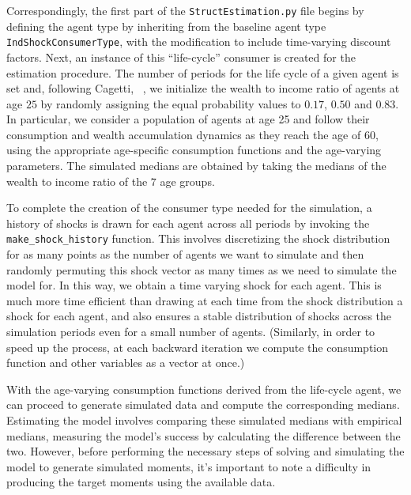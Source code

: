 \documentclass[titlepage, headings=optiontotocandhead]{econtex}
\begin{document}
Correspondingly, the first part of the \texttt{StructEstimation.py} file begins by defining the agent type by inheriting from the baseline agent type \texttt{IndShockConsumerType}, with the modification to include time-varying discount factors. Next, an instance of this ``life-cycle'' consumer is created for the estimation procedure.  The number of periods for the life cycle of a given agent is set and, following Cagetti, ~\citeyearpar{cagettiWprofiles}, we initialize the wealth to income ratio of agents at age $25$ by randomly assigning the equal probability values to $0.17$, $0.50$ and $0.83$. In particular, we consider a population of agents at age 25 and follow their consumption and wealth accumulation dynamics as they reach the age of $60$, using the appropriate age-specific consumption functions and the age-varying parameters. The simulated medians are obtained by taking the medians of the wealth to income ratio of the $7$ age groups.

To complete the creation of the consumer type needed for the simulation, a history of shocks is drawn for each agent across all periods by invoking the \texttt{make\_shock\_history} function. This involves discretizing the shock distribution for as many points as the number of agents we want to simulate and then randomly permuting this shock vector as many times as we need to simulate the model for. In this way, we obtain a time varying shock for each agent. This is much more time efficient than drawing at each time from the shock distribution a shock for each agent, and also ensures a stable distribution of shocks across the simulation periods even for a small number of agents. (Similarly, in order to speed up the process, at each backward iteration we compute the consumption function and other variables as a vector at once.)

With the age-varying consumption functions derived from the life-cycle agent, we can proceed to generate simulated data and compute the corresponding medians.  Estimating the model involves comparing these simulated medians with empirical medians, measuring the model's success by calculating the difference between the two.  However, before performing the necessary steps of solving and simulating the model to generate simulated moments, it's important to note a difficulty in producing the target moments using the available data.
\end{document}
